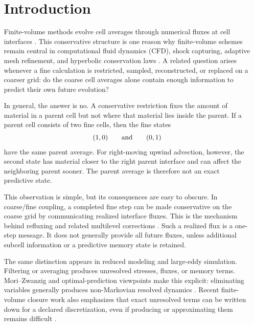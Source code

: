 \documentclass[pdflatex,sn-mathphys-num]{sn-jnl}%
\theoremstyle{thmstyleone}%
\theoremstyle{thmstyletwo}%
\theoremstyle{thmstylethree}%
\begin{document}
\section{Introduction} \label{intro}

Finite-volume methods evolve cell averages through numerical fluxes at cell
interfaces \cite{LeVeque:2002fvm,EymardGallouetHerbin:2000fvm,
MoukalledManganiDarwish:2016fvm}.  This conservative structure is one reason
why finite-volume schemes remain central in computational fluid dynamics (CFD),
shock capturing, adaptive mesh refinement, and hyperbolic conservation laws
\cite{CrandallMajda:1980monotone,Berger:1987interfaces,
BergerColella:1989amr,KurganovTadmor:2000central,
GottliebShuTadmor:2001ssp}.  A related question arises whenever a fine
calculation is restricted, sampled, reconstructed, or replaced on a coarser
grid: do the coarse cell averages alone contain enough information to
predict their own future evolution?

In general, the answer is no.  A conservative restriction fixes the amount
of material in a parent cell but not where that material lies inside the
parent.  If a parent cell consists of two fine cells, then the fine states
\[
  (1,0)
  \qquad\hbox{and}\qquad
  (0,1)
\]
have the same parent average.  For right-moving upwind advection, however,
the second state has material closer to the right parent interface and can
affect the neighboring parent sooner.  The parent average is therefore not an
exact predictive state.

This observation is simple, but its consequences are easy to obscure.  In
coarse/fine coupling, a completed fine step can be made conservative on the
coarse grid by communicating realized interface fluxes.  This is the
mechanism behind refluxing and related multilevel corrections
\cite{OsherSanders:1983localtime,ConstantinescuSandu:2007multirate,Thornber:2008entropy}.  Such a
realized flux is a one-step message.  It does not generally provide all
future fluxes, unless additional subcell information or a predictive memory
state is retained.

The same distinction appears in reduced modeling and large-eddy simulation.
Filtering or averaging produces unresolved stresses, fluxes, or memory
terms.  Mori--Zwanzig \cite{mori1965,zwanzig1961} and optimal-prediction viewpoints make this explicit:
eliminating variables generally produces non-Markovian resolved dynamics
\cite{ChorinHaldKupferman:2002memory,ParishDuraisamy:2017nonmarkovian,
GouasmiParishDuraisamy:2017memory,LinTianLivescuAnghel:2021mzlearning}.
Recent finite-volume closure work also emphasizes that exact unresolved
terms can be written down for a declared discretization, even if producing or
approximating them remains difficult \cite{Agdestein:2026exactfvclosure}.
\end{document}
